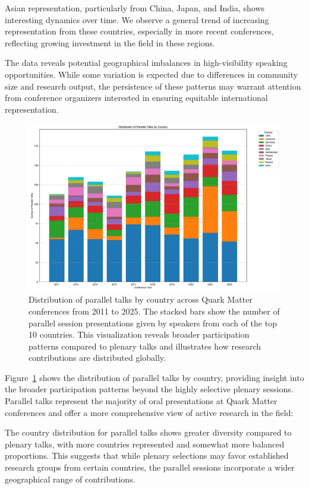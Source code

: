 \documentclass[a4paper,11pt]{article}
\begin{document}
Asian representation, particularly from China, Japan, and India, shows interesting dynamics over time. We observe a general trend of increasing representation from these countries, especially in more recent conferences, reflecting growing investment in the field in these regions.

The data reveals potential geographical imbalances in high-visibility speaking opportunities. While some variation is expected due to differences in community size and research output, the persistence of these patterns may warrant attention from conference organizers interested in ensuring equitable international representation.

\begin{figure}[H]
\centering
\includegraphics[width=\textwidth]{figures/parallel_talks_by_country.pdf}
\caption{Distribution of parallel talks by country across Quark Matter conferences from 2011 to 2025. The stacked bars show the number of parallel session presentations given by speakers from each of the top 10 countries. This visualization reveals broader participation patterns compared to plenary talks and illustrates how research contributions are distributed globally.}
\label{fig:country_parallel}
\end{figure}

Figure~\ref{fig:country_parallel} shows the distribution of parallel talks by country, providing insight into the broader participation patterns beyond the highly selective plenary sessions. Parallel talks represent the majority of oral presentations at Quark Matter conferences and offer a more comprehensive view of active research in the field:

The country distribution for parallel talks shows greater diversity compared to plenary talks, with more countries represented and somewhat more balanced proportions. This suggests that while plenary selections may favor established research groups from certain countries, the parallel sessions incorporate a wider geographical range of contributions.
\end{document}
